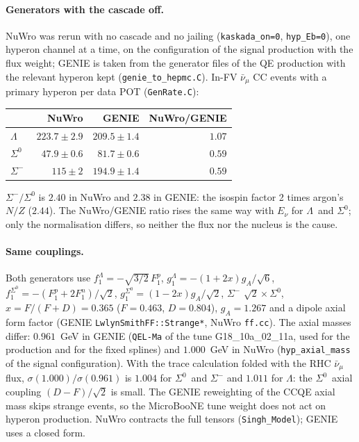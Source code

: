 \documentclass[11pt,a4paper]{article}
\newcommand{\Szero}{\ensuremath{\Sigma^{0}}}
\newcommand{\Lam}{\ensuremath{\Lambda}}
\newcommand{\numubar}{\ensuremath{\bar{\nu}_\mu}}
\begin{document}
\paragraph{Generators with the cascade off.} NuWro was rerun with no cascade and no
jailing (\texttt{kaskada\_on=0}, \texttt{hyp\_Eb=0}), one hyperon channel at a time, on
the configuration of the signal production with the flux weight; GENIE is taken from the
generator files of the QE production with the relevant hyperon kept
(\texttt{genie\_to\_hepmc.C}). In-FV $\numubar$ CC events with a primary hyperon per data
POT (\texttt{GenRate.C}):
\begin{center}
\small
\begin{tabular}{lrrr}
\toprule
 & NuWro & GENIE & NuWro/GENIE \\
\midrule
\Lam\         & $223.7\pm2.9$ & $209.5\pm1.4$ & $1.07$ \\
\Szero\       & $47.9\pm0.6$  & $81.7\pm0.6$  & $0.59$ \\
$\Sigma^-$    & $115\pm2$     & $194.9\pm1.4$ & $0.59$ \\
\bottomrule
\end{tabular}
\end{center}
$\Sigma^-/\Szero$ is $2.40$ in NuWro and $2.38$ in GENIE: the isospin factor 2 times
argon's $N/Z$ ($2.44$). The NuWro/GENIE ratio rises the same way with $E_\nu$ for \Lam\ and
\Szero; only the normalisation differs, so neither the flux nor the nucleus is the cause.

\paragraph{Same couplings.} Both generators use $f_1^{\Lam}=-\sqrt{3/2}\,F_1^p$,
$g_1^{\Lam}=-(1+2x)g_A/\sqrt6$, $f_1^{\Szero}=-(F_1^p+2F_1^n)/\sqrt2$,
$g_1^{\Szero}=(1-2x)g_A/\sqrt2$, $\Sigma^-$ $\sqrt2\times\Szero$, $x=F/(F+D)=0.365$
($F=0.463$, $D=0.804$), $g_A=1.267$ and a dipole axial form factor (GENIE
\texttt{LwlynSmithFF::Strange*}, NuWro \texttt{ff.cc}). The axial masses differ: $0.961$~GeV in
GENIE (\texttt{QEL-Ma} of the tune G18\_10a\_02\_11a, used for the production and for the fixed
splines) and $1.000$~GeV in NuWro (\texttt{hyp\_axial\_mass} of the signal configuration). With the
trace calculation folded with the RHC $\numubar$ flux, $\sigma(1.000)/\sigma(0.961)$ is $1.004$ for
\Szero\ and $\Sigma^-$ and $1.011$ for \Lam: the \Szero\ axial coupling $(D-F)/\sqrt2$ is small. The
GENIE reweighting of the CCQE axial mass skips strange events, so the MicroBooNE tune weight does
not act on hyperon production.
NuWro contracts the full tensors (\texttt{Singh\_Model}); GENIE uses a closed form.
\end{document}
